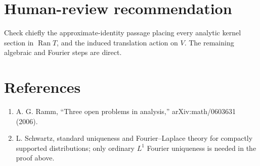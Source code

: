 \documentclass[11pt]{article}
\begin{document}
\section*{Human-review recommendation}

Check chiefly the approximate-identity passage placing every analytic kernel
section in $\operatorname{Ran}T$, and the induced translation action on $V$.
The remaining algebraic and Fourier steps are direct.

\section*{References}

\begin{enumerate}
\item A. G. Ramm, ``Three open problems in analysis,''
  arXiv:math/0603631 (2006).
\item L. Schwartz, standard uniqueness and Fourier--Laplace theory for
  compactly supported distributions; only ordinary $L^1$ Fourier uniqueness
  is needed in the proof above.
\end{enumerate}
\end{document}

